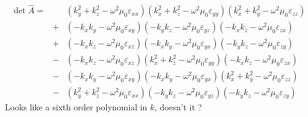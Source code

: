 \documentclass[12pt,a4paper,twoside,openright,BCOR10mm,headsepline,titlepage,abstracton,chapterprefix,final]{scrreprt}
\newcommand\vacuum{0}
\newcommand\wavenumber{k}
\newcommand\vacuumpermeability{\scalarpermeability_{\vacuum}}
\newcommand\scalarpermeability{\mu}
\newcommand\scalarpermittivity{\varepsilon}
\begin{document}
\begin{eqnarray}
 \det \hat{A} =&& 
     (   \wavenumber_y^2 + \wavenumber_z^2 - \omega^2 \vacuumpermeability \scalarpermittivity_{xx} )
     (   \wavenumber_x^2 + \wavenumber_z^2 - \omega^2 \vacuumpermeability \scalarpermittivity_{yy} )
     (   \wavenumber_x^2 + \wavenumber_y^2 - \omega^2 \vacuumpermeability \scalarpermittivity_{zz} )
 \nonumber\\&+&
     ( - \wavenumber_x \wavenumber_y - \omega^2 \vacuumpermeability \scalarpermittivity_{xy} )
     ( - \wavenumber_y \wavenumber_z - \omega^2 \vacuumpermeability \scalarpermittivity_{yz} )
     ( - \wavenumber_x \wavenumber_z - \omega^2 \vacuumpermeability \scalarpermittivity_{zx} )
 \nonumber\\&+&
     ( - \wavenumber_x \wavenumber_z - \omega^2 \vacuumpermeability \scalarpermittivity_{xz} )
     ( - \wavenumber_x \wavenumber_y - \omega^2 \vacuumpermeability \scalarpermittivity_{yx} )
     ( - \wavenumber_y \wavenumber_z - \omega^2 \vacuumpermeability \scalarpermittivity_{zy} )
 \nonumber\\&-&    
     ( - \wavenumber_x \wavenumber_z - \omega^2 \vacuumpermeability \scalarpermittivity_{xz} )     
     (   \wavenumber_x^2 + \wavenumber_z^2 - \omega^2 \vacuumpermeability \scalarpermittivity_{yy} )    
     ( - \wavenumber_x \wavenumber_z - \omega^2 \vacuumpermeability \scalarpermittivity_{zx} )
 \nonumber\\&-&
     ( - \wavenumber_x \wavenumber_y - \omega^2 \vacuumpermeability \scalarpermittivity_{xy} )
     ( - \wavenumber_x \wavenumber_y - \omega^2 \vacuumpermeability \scalarpermittivity_{yx} )
     (   \wavenumber_x^2 + \wavenumber_y^2 - \omega^2 \vacuumpermeability \scalarpermittivity_{zz} )
 \nonumber\\&-&
     (   \wavenumber_y^2 + \wavenumber_z^2 - \omega^2 \vacuumpermeability \scalarpermittivity_{xx} )
     ( - \wavenumber_y \wavenumber_z - \omega^2 \vacuumpermeability \scalarpermittivity_{yz} )
     ( - \wavenumber_y \wavenumber_z - \omega^2 \vacuumpermeability \scalarpermittivity_{zy} )
\end{eqnarray}
Looks like a sixth order polynomial in $\wavenumber$, doesn't it ?
\end{document}
